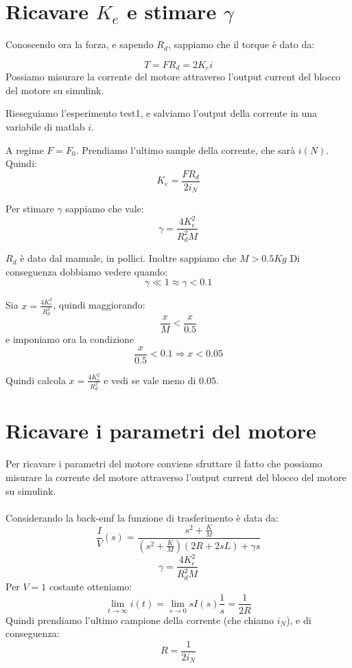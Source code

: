 \documentclass[10pt,a4paper]{article}
\begin{document}
\section{Ricavare $K_e$ e stimare $\gamma$}
Conoscendo ora la forza, e sapendo $R_d$, sappiamo che il torque è dato da:

$$T = FR_d = 2K_e i$$
Possiamo misurare la corrente del motore attraverso l'output current del blocco del motore su simulink.

Rieseguiamo l'esperimento test1, e salviamo l'output della corrente in una variabile di matlab $i$.

A regime $F=F_0$. Prendiamo l'ultimo sample della corrente, che sarà $i(N)$. Quindi:
$$K_e = \frac{FR_d}{2i_N}$$

Per stimare $\gamma$ sappiamo che vale:
$$\gamma = \frac{4K_e^2}{R_d^2M}$$

$R_d$ è dato dal manuale, in pollici. Inoltre sappiamo che $M > 0.5Kg$
Di conseguenza dobbiamo vedere quando:
$$\gamma \ll 1 \approx \gamma < 0.1$$

Sia $ x= \frac{4K_e^2}{R_d^2}$, quindi maggiorando:
$$ \frac{x}{M} < \frac{x}{0.5}$$
e imponiamo ora la condizione
$$\frac{x}{0.5}<0.1 \Rightarrow x < 0.05$$

Quindi calcola $ x= \frac{4K_e^2}{R_d^2}$ e vedi se vale meno di $0.05$.

\newpage
\section{Ricavare i parametri del motore}
Per ricavare i parametri del motore conviene sfruttare il fatto che possiamo misurare la corrente del motore attraverso l'output current del blocco del motore su simulink. \\ \\
Considerando la back-emf la funzione di trasferimento è data da:
$$\frac{I}{V}(s) = \frac{s^2+\frac{K}{M}}{(s^2+\frac{K}{M})(2R+2sL)+\gamma s}$$
$$\gamma = \frac{4K_e^2}{R_d^2M}$$
Per $V=1$ costante otteniamo:
$$\lim_{t \to \infty} i(t) = \lim_{s \to 0} sI(s)\frac{1}{s} = \frac{1}{2R}$$
Quindi prendiamo l'ultimo campione della corrente (che chiamo $i_N$), e di conseguenza:
$$R = \frac{1}{2i_N}$$
\end{document}
